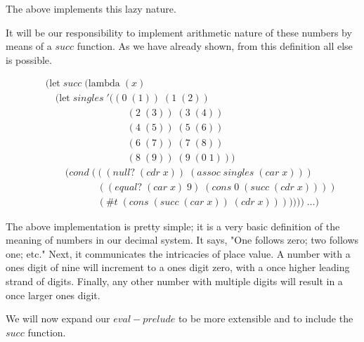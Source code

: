 The above implements this lazy nature.

It will be our responsibility to implement arithmetic nature of these numbers 
by means of a $succ$ function. As we have already shown, from this definition 
all else is possible.

\begin{figure}[ht]
\caption{}\label{scheme}
\begin{align*}
& (\text{let} \; succ \; (\text{lambda} \; (x)
\\& \quad (\text{let} \; singles \; '((0 \; (1)) \; (1 \; (2)) \; 
\\& \qquad \qquad \qquad \qquad \; (2 \; (3)) \; (3 \; (4)) \; 
\\& \qquad \qquad \qquad \qquad \; (4 \; (5)) \; (5 \; (6)) \; 
\\& \qquad \qquad \qquad \qquad \; (6 \; (7)) \; (7 \; (8)) \; 
\\& \qquad \qquad \qquad \qquad \; (8 \; (9)) \; (9 \; (0 \; 1)))
\\& \qquad (cond \; (((null? \; (cdr \; x)) \; (assoc \; singles \; (car \; x)))
\\& \qquad \qquad \quad \; ((equal? \; (car \; x) \; 9) \; (cons \; 0 \; (succ \; (cdr \; x))))
\\& \qquad \qquad \quad \; (\#t \; (cons \; (succ \; (car \; x)) \; (cdr \; x))))))) \; \dots)
\end{align*}
\end{figure}

The above implementation is pretty simple; it is a very basic definition of 
the meaning of numbers in our decimal system. It says, "One follows zero; two 
follows one; etc." Next, it communicates the intricacies of place value. A 
number with a ones digit of nine will increment to a ones digit zero, with a 
once higher leading strand of digits. Finally, any other number with multiple 
digits will result in a once larger ones digit.

We will now expand our $eval-prelude$ to be more extensible and to include 
the $succ$ function.

